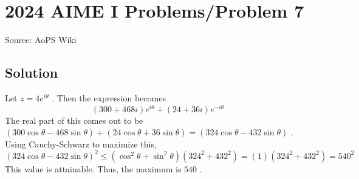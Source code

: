 \documentclass[12pt]{article}
\begin{document}
\section*{{2024 AIME I Problems/Problem 7}}
Source: AoPS Wiki

\subsection*{Solution}
Let $z=4e^{i\theta}$ . Then the expression becomes \[(300+468i)e^{i\theta}+(24+36i)e^{-i\theta}\] The real part of this comes out to be $(300\cos \theta - 468 \sin \theta)+(24\cos \theta + 36 \sin \theta) = (324\cos \theta - 432 \sin \theta)$ . Using Cauchy-Schwarz to maximize this, \[(324\cos \theta - 432 \sin \theta)^2 \leq (\cos ^2 \theta+\sin ^2 \theta)(324^2+432^2) = (1)(324^2+432^2) = 540^2\] This value is attainable. Thus, the maximum is $\boxed{540}$ .
\end{document}
